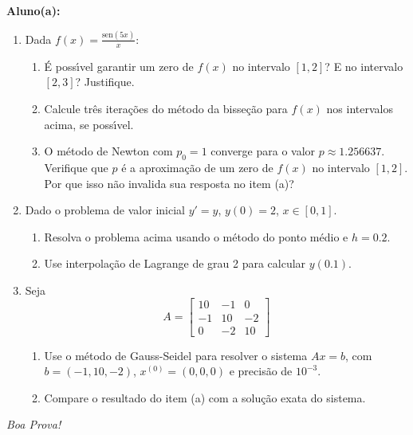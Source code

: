 \documentclass[a4paper,5pt]{amsbook}
\newcommand{\sen}{\text{sen}}
\newcommand{\ds}{\displaystyle}
\begin{document}
\vspace{0.5cm}
{\bf Aluno(a):}\dotfill{} %

\vspace{1cm}
\begin{enumerate}
	\vspace{0.5cm}
	\item Dada $\ds f(x) = \frac{\sen{(5x)}}{x}$:
		\begin{enumerate}
			\vspace{0.3cm}
			\item \'{E} poss\'{\i}vel garantir um zero de $f(x)$ no intervalo $[1,2]$? E no intervalo $[2,3]$? Justifique.
			\vspace{0.3cm}
			\item Calcule tr\^es itera\c{c}\~oes do m\'etodo da bisse\c{c}\~ao para $f(x)$ nos intervalos acima, se poss\'{\i}vel.
			\vspace{0.3cm}
			\item O m\'etodo de Newton com $p_0=1$ converge para o valor $p
				\approx 1.256637$. Verifique que $p$ \'e a aproxima\c{c}\~ao de um zero
				de $f(x)$ no intervalo $[1,2]$. Por que isso n\~ao invalida sua
				resposta no item (a)?
		\end{enumerate}

	\vspace{0.5cm}
	\item Dado o problema de valor inicial $y'=y$, $y(0)=2$, $x\in[0,1]$.
		\begin{enumerate}
			\vspace{0.3cm}
			\item Resolva o problema acima usando o m\'etodo do ponto m\'edio e $h=0.2$.
			\vspace{0.3cm}
			\item Use interpola\c{c}\~ao de Lagrange de grau 2 para calcular $y(0.1)$.
		\end{enumerate}

	\vspace{0.5cm}
	\item Seja
		\[A = \left[\begin{array}{ccc}
					10 & -1 & 0 \\
					-1 & 10 & -2 \\
					0 & -2 & 10
				\end{array}\right]\]
		\begin{enumerate}
			\vspace{0.3cm}
			\item Use o m\'etodo de Gauss-Seidel para resolver o sistema $Ax = b$, com $b=(-1, 10, -2)$, $x^{(0)}= (0, 0, 0)$ e precis\~ao de $10^{-3}$.
			\vspace{0.3cm}
			\item Compare o resultado do item (a) com a solu\c{c}\~ao exata do sistema.
		\end{enumerate}
\end{enumerate}

\begin{flushright}
	\vspace{1cm}
	\textit{Boa Prova!}
\end{flushright}
\end{document}
